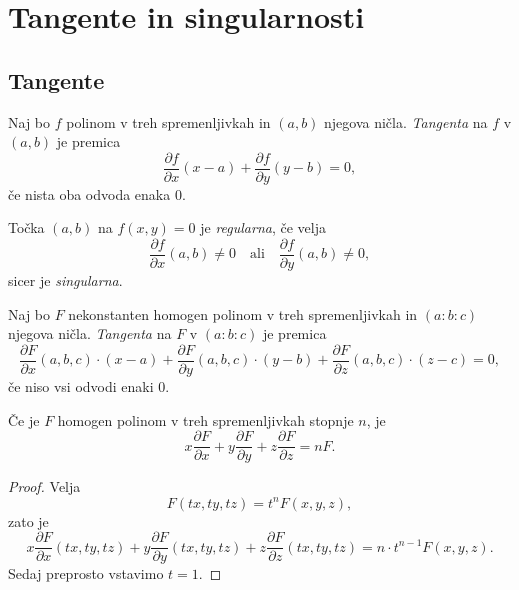 \section{Tangente in singularnosti}

\subsection{Tangente}

\begin{definicija}
Naj bo $f$ polinom v treh spremenljivkah in $(a, b)$ njegova ničla.
\emph{Tangenta} na $f$ v
$(a, b)$ je premica
\[
\frac{\partial f}{\partial x} (x - a) +
\frac{\partial f}{\partial y} (y - b) =
0,
\]
če nista oba odvoda enaka $0$.
\end{definicija}

\begin{definicija}
Točka $(a, b)$ na $f(x, y) = 0$ je
\emph{regularna}, če velja
\[
\frac{\partial f}{\partial x} (a, b) \ne 0
\quad \text{ali} \quad
\frac{\partial f}{\partial y} (a, b) \ne 0,
\]
sicer je \emph{singularna}.
\end{definicija}

\begin{definicija}
Naj bo $F$ nekonstanten homogen polinom v treh spremenljivkah in
$(a : b : c)$ njegova ničla.
\emph{Tangenta} na $F$ v
$(a : b : c)$ je premica
\[
\frac{\partial F}{\partial x}(a,b,c) \cdot (x - a) +
\frac{\partial F}{\partial y}(a,b,c) \cdot (y - b) +
\frac{\partial F}{\partial z}(a,b,c) \cdot (z - c) =
0,
\]
če niso vsi odvodi enaki $0$.
\end{definicija}

\begin{izrek}
Če je $F$ homogen polinom v treh spremenljivkah stopnje $n$, je
\[
x \frac{\partial F}{\partial x} +
y \frac{\partial F}{\partial y} +
z \frac{\partial F}{\partial z} =
n F.
\]
\end{izrek}

\begin{proof}
Velja
\[
F(tx, ty, tz) = t^n F(x, y, z),
\]
zato je
\[
x \frac{\partial F}{\partial x}(tx, ty, tz) +
y \frac{\partial F}{\partial y}(tx, ty, tz) +
z \frac{\partial F}{\partial z}(tx, ty, tz) =
n \cdot t^{n-1} F(x, y, z).
\]
Sedaj preprosto vstavimo $t = 1$.
\end{proof}

